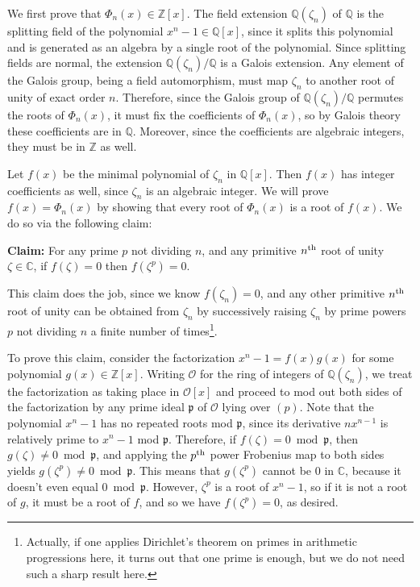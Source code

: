 \documentclass[12pt]{article}
\newcommand{\Z}{\mathbb{Z}}
\newcommand{\Q}{\mathbb{Q}}
\renewcommand{\O}{\mathcal{O}}
\newcommand{\p}{\mathfrak{p}}
\begin{document}
We first prove that $\Phi_n(x) \in \Z[x]$. The field extension $\Q(\zeta_n)$ of $\Q$ is the splitting field of the polynomial $x^n - 1 \in \Q[x]$, since it splits this polynomial and is generated as an algebra by a single root of the polynomial. Since splitting fields are normal, the extension $\Q(\zeta_n)/\Q$ is a Galois extension. Any element of the Galois group, being a field automorphism, must map $\zeta_n$ to another root of unity of exact order $n$. Therefore, since the Galois group of $\Q(\zeta_n)/\Q$ permutes the roots of $\Phi_n(x)$, it must fix the coefficients of $\Phi_n(x)$, so by Galois theory these coefficients are in $\Q$. Moreover, since the coefficients are algebraic integers, they must be in $\Z$ as well.

Let $f(x)$ be the minimal polynomial of $\zeta_n$ in $\Q[x]$. Then $f(x)$ has integer coefficients as well, since $\zeta_n$ is an algebraic integer. We will prove $f(x) = \Phi_n(x)$ by showing that every root of $\Phi_n(x)$ is a root of $f(x)$. We do so via the following claim:

{\bf Claim:} For any prime $p$ not dividing $n$, and any primitive $n^{\rm th}$ root of unity $\zeta \in \mathbb{C}$, if $f(\zeta) = 0$ then $f(\zeta^p) = 0$.

This claim does the job, since we know $f(\zeta_n) = 0$, and any other primitive $n^{\rm th}$ root of unity can be obtained from $\zeta_n$ by successively raising $\zeta_n$ by prime powers $p$ not dividing $n$ a finite number of times\footnote{Actually, if one applies Dirichlet's theorem on primes in arithmetic progressions here, it turns out that one prime is enough, but we do not need such a sharp result here.}.

To prove this claim, consider the factorization $x^n - 1 = f(x) g(x)$ for some polynomial $g(x) \in \Z[x]$. Writing $\O$ for the ring of integers of $\Q(\zeta_n)$, we treat the factorization as taking place in $\O[x]$ and proceed to mod out both sides of the factorization by any prime ideal $\p$ of $\O$ lying over $(p)$. Note that the polynomial $x^n - 1$ has no repeated roots mod $\p$, since its derivative $n x^{n-1}$ is relatively prime to $x^n - 1$ mod $\p$. Therefore, if $f(\zeta) = 0 \bmod \p$, then $g(\zeta) \neq 0 \bmod \p$, and applying the $p^{\rm th}$ power Frobenius map to both sides yields $g(\zeta^p) \neq 0 \bmod \p$. This means that $g(\zeta^p)$ cannot be 0 in $\mathbb{C}$, because it doesn't even equal $0 \bmod \p$. However, $\zeta^p$ is a root of $x^n - 1$, so if it is not a root of $g$, it must be a root of $f$, and so we have $f(\zeta^p) = 0$, as desired.
\end{document}
